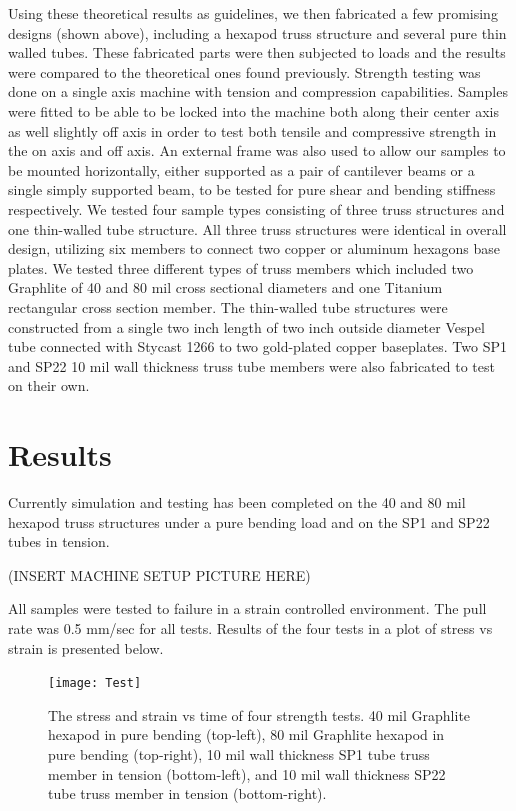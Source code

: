 \documentclass[final]{svjour2}
\begin{document}
Using these theoretical results as guidelines, we then fabricated a few promising designs (shown above), including a hexapod truss structure and several pure thin walled tubes. These fabricated parts were then subjected to loads and the results were compared to the theoretical ones found previously.  Strength testing was done on a single axis machine with tension and compression capabilities. Samples were fitted to be able to be locked into the machine both along their center axis as well slightly off axis in order to test both tensile and compressive strength in the on axis and off axis.  An external frame was also used to allow our samples to be mounted horizontally, either supported as a pair of cantilever beams or a single simply supported beam, to be tested for pure shear and bending stiffness respectively.  We tested four sample types consisting of three truss structures and one thin-walled tube structure.  All three truss structures were identical in overall design, utilizing six members to connect two copper or aluminum hexagons base plates.  We tested three different types of truss members which included two Graphlite of 40 and 80 mil cross sectional diameters and one Titanium rectangular cross section member. The thin-walled tube structures were constructed from a single two inch length of two inch outside diameter Vespel tube connected with Stycast 1266 to two gold-plated copper baseplates. Two SP1 and SP22 10 mil wall thickness truss tube members were also fabricated to test on their own.

\section{Results}
Currently simulation and testing has been completed on the 40 and 80 mil hexapod truss structures under a pure bending load and on the SP1 and SP22 tubes in tension.  

(INSERT MACHINE SETUP PICTURE HERE)

All samples were tested to failure in a strain controlled environment.  The pull rate was 0.5 mm/sec for all tests.  Results of the four tests in a plot of stress vs strain is presented below.

\begin{figure}[!ht]
\begin{center}
\texttt{[image: Test]}
\end{center}
\caption{The stress and strain vs time of four strength tests. 40 mil Graphlite hexapod in pure bending (top-left), 80 mil Graphlite hexapod in pure bending (top-right), 10 mil wall thickness SP1 tube truss member in tension (bottom-left), and 10 mil wall thickness SP22 tube truss member in tension (bottom-right).}
\label{Test}
\end{figure}
\end{document}
